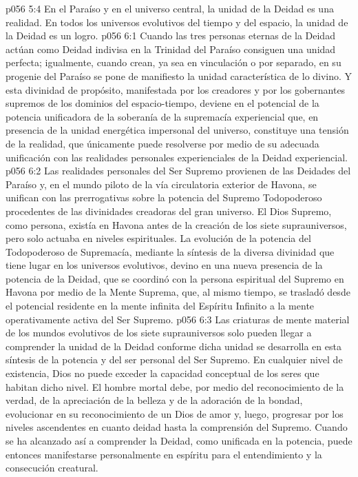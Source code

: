 \vs p056 5:4 \pc En el Paraíso y en el universo central, la unidad de la Deidad es una realidad. En todos los universos evolutivos del tiempo y del espacio, la unidad de la Deidad es un logro.
\vs p056 6:1 Cuando las tres personas eternas de la Deidad actúan como Deidad indivisa en la Trinidad del Paraíso consiguen una unidad perfecta; igualmente, cuando crean, ya sea en vinculación o por separado, en su progenie del Paraíso se pone de manifiesto la unidad característica de lo divino. Y esta divinidad de propósito, manifestada por los creadores y por los gobernantes supremos de los dominios del espacio\hyp{}tiempo, deviene en el potencial de la potencia unificadora de la soberanía de la supremacía experiencial que, en presencia de la unidad energética impersonal del universo, constituye una tensión de la realidad, que únicamente puede resolverse por medio de su adecuada unificación con las realidades personales experienciales de la Deidad experiencial.
\vs p056 6:2 Las realidades personales del Ser Supremo provienen de las Deidades del Paraíso y, en el mundo piloto de la vía circulatoria exterior de Havona, se unifican con las prerrogativas sobre la potencia del Supremo Todopoderoso procedentes de las divinidades creadoras del gran universo. El Dios Supremo, como persona, existía en Havona antes de la creación de los siete suprauniversos, pero solo actuaba en niveles espirituales. La evolución de la potencia del Todopoderoso de Supremacía, mediante la síntesis de la diversa divinidad que tiene lugar en los universos evolutivos, devino en una nueva presencia de la potencia de la Deidad, que se coordinó con la persona espiritual del Supremo en Havona por medio de la Mente Suprema, que, al mismo tiempo, se trasladó desde el potencial residente en la mente infinita del Espíritu Infinito a la mente operativamente activa del Ser Supremo.
\vs p056 6:3 \pc Las criaturas de mente material de los mundos evolutivos de los siete suprauniversos solo pueden llegar a comprender la unidad de la Deidad conforme dicha unidad se desarrolla en esta síntesis de la potencia y del ser personal del Ser Supremo. En cualquier nivel de existencia, Dios no puede exceder la capacidad conceptual de los seres que habitan dicho nivel. El hombre mortal debe, por medio del reconocimiento de la verdad, de la apreciación de la belleza y de la adoración de la bondad, evolucionar en su reconocimiento de un Dios de amor y, luego, progresar por los niveles ascendentes en cuanto deidad hasta la comprensión del Supremo. Cuando se ha alcanzado así a comprender la Deidad, como unificada en la potencia, puede entonces manifestarse personalmente en espíritu para el entendimiento y la consecución creatural.
